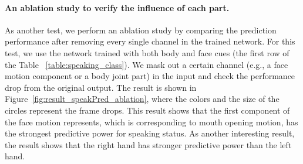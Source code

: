 \paragraph{An ablation study to verify the influence of each part.} As another test, we perform an ablation study by comparing the prediction performance after removing every single channel in the trained network. For this test, we use the network trained with both body and face cues (the first row of the Table ~\ref{table:speaking_class}). We mask out a certain channel (e.g., a face motion component or a body joint part) in the input and check the performance drop from the original output. The result is shown in Figure~\ref{fig:result_speakPred_ablation}, where the colors and the size of the circles represent the frame drops. This result shows that the first component of the face motion represents, which is corresponding to mouth opening motion, has the strongest predictive power for speaking status. As another interesting result, the result shows that the right hand has stronger predictive power than the left hand.  

